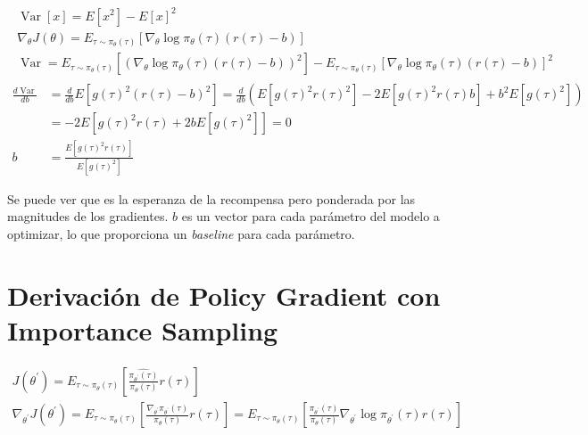 \begin{align}
\left. \begin{array} { l } { \operatorname { Var } [ x ] = E [ x ^ { 2 } ] - E [ x ] ^ { 2 } } \\
{ \nabla _ { \theta } J ( \theta ) = E _ { \tau \sim \pi _ { \theta } ( \tau ) } [ \nabla _ {
\theta } \operatorname { log } \pi _ { \theta } ( \tau ) ( r ( \tau ) - b ) ] } \\ {
\operatorname { Var } = E _ { \tau \sim \pi _ { \theta } ( \tau ) } [ ( \nabla _ { \theta }
\operatorname { log } \pi _ { \theta } ( \tau ) ( r ( \tau ) - b ) ) ^ { 2 } ] - E _ { \tau \sim
\pi _ { \theta } ( \tau ) } [ \nabla _ { \theta } \operatorname { log } \pi _ { \theta } ( \tau )
( r ( \tau ) - b ) ] ^ { 2 } } \end{array} \right.
\end{align}
\begin{align}
    \frac { d \operatorname { Var } } { d b } &= \frac { d } { d b } E [ g ( \tau ) ^ { 2 } ( r ( \tau
    ) - b ) ^ { 2 } ] = \frac { d } { d b } ( E [ g ( \tau ) ^ { 2 } r ( \tau ) ^ { 2 } ] - 2 E [ g (
    \tau ) ^ { 2 } r ( \tau ) b ] + b ^ { 2 } E [ g ( \tau ) ^ { 2 } ] )\\
                                              &= -2E[g(\tau)^2r(\tau)+2bE[g(\tau)^2]] = 0
    \\b &= \frac{E[g(\tau)^2r(\tau)]}{E[g(\tau)^2]} 
\end{align}

Se puede ver que es la esperanza de la recompensa pero ponderada por las magnitudes de los
gradientes. $b$ es un vector para cada parámetro del modelo a optimizar, lo que proporciona un
\textit{baseline} para cada parámetro.

\section{Derivación de Policy Gradient con Importance Sampling}%
\label{sec:derivación_de_policy_gradient_con_importance_sampling}

\begin{align}
J ( \theta ^ { \prime } ) = E _ { \tau \sim \pi _ { \theta } ( \tau ) } [ \frac { \hat { \pi _ {
\theta ^ { \prime } } ( \tau ) } } { \pi _ { \theta } ( \tau ) } r ( \tau ) ]\\
\nabla _ { \theta ^ { \prime } } J ( \theta ^ { \prime } ) = E _ { \tau \sim \pi _ { \theta } (
\tau ) } [ \frac { \nabla _ { \theta ^ { \prime } } \pi _ { \theta ^ { \prime } } ( \tau ) } {
\pi _ { \theta } ( \tau ) } r ( \tau ) ] = E _ { \tau \sim \pi _ { \theta } ( \tau ) } [ \frac {
\pi _ { \theta ^ { \prime } } ( \tau ) } { \pi _ { \theta } ( \tau ) } \nabla _ { \theta ^ {
\prime } } \operatorname { log } \pi _ { \theta ^ { \prime } } ( \tau ) r ( \tau ) ]
\end{align}

